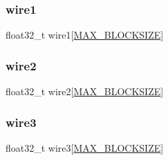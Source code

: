 \subsubsection{\texorpdfstring{wire1}{wire1}}
{\footnotesize\ttfamily float32\+\_\+t wire1\mbox{[}\hyperlink{pkg__cmsis-dsp_2main_8c_af8a1d2ed31f7c9a00fec46a798edb61b}{M\+A\+X\+\_\+\+B\+L\+O\+C\+K\+S\+I\+ZE}\mbox{]}}

\mbox{\label{pkg__cmsis-dsp_2main_8c_a41a9afab5be5ccd2e6f618b83102f0d1}} 
\subsubsection{\texorpdfstring{wire2}{wire2}}
{\footnotesize\ttfamily float32\+\_\+t wire2\mbox{[}\hyperlink{pkg__cmsis-dsp_2main_8c_af8a1d2ed31f7c9a00fec46a798edb61b}{M\+A\+X\+\_\+\+B\+L\+O\+C\+K\+S\+I\+ZE}\mbox{]}}

\mbox{\label{pkg__cmsis-dsp_2main_8c_af61f43ad332a2322e43ced590b6d9768}} 
\subsubsection{\texorpdfstring{wire3}{wire3}}
{\footnotesize\ttfamily float32\+\_\+t wire3\mbox{[}\hyperlink{pkg__cmsis-dsp_2main_8c_af8a1d2ed31f7c9a00fec46a798edb61b}{M\+A\+X\+\_\+\+B\+L\+O\+C\+K\+S\+I\+ZE}\mbox{]}}

